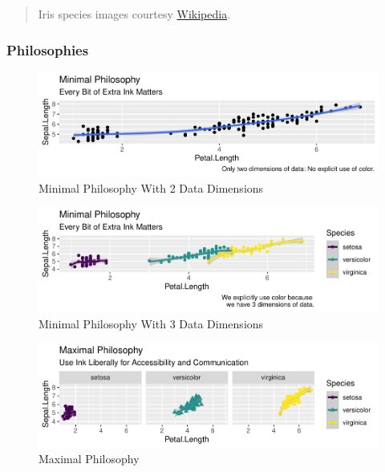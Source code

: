 \documentclass[
]{article}
\begin{document}
\begin{quote}
Iris species images courtesy
\href{https://www.wikipedia.org/}{Wikipedia}.
\end{quote}

\hypertarget{philosophies}{%
\subsubsection{Philosophies}\label{philosophies}}

\begin{figure}
\centering
\includegraphics{design_files/figure-latex/unnamed-chunk-12-1.pdf}
\caption{Minimal Philosophy With 2 Data Dimensions}
\end{figure}

\begin{figure}
\centering
\includegraphics{design_files/figure-latex/unnamed-chunk-13-1.pdf}
\caption{Minimal Philosophy With 3 Data Dimensions}
\end{figure}

\begin{figure}
\centering
\includegraphics{design_files/figure-latex/unnamed-chunk-14-1.pdf}
\caption{Maximal Philosophy}
\end{figure}
\end{document}
